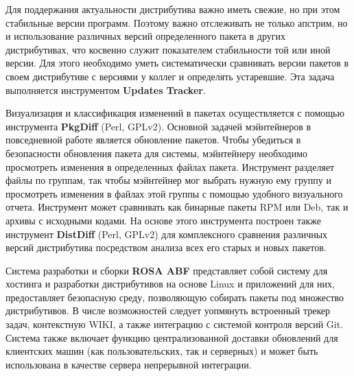 \documentclass[10pt, a5paper]{article}
\begin{document}
Для поддержания актуальности дистрибутива важно иметь свежие, но при этом стабильные версии программ. Поэтому важно отслеживать не только апстрим, но и использование различных версий определенного пакета в других дистрибутивах, что косвенно служит показателем стабильности той или иной версии. Для этого необходимо уметь систематически сравнивать версии пакетов в своем дистрибутиве с версиями у коллег и определять устаревшие. Эта задача выполняется инструментом \textbf{Updates Tracker}.

Визуализация и классификация изменений в пакетах осуществляется с помощью инструмента \textbf{PkgDiff} (Perl, GPLv2). Основной задачей мэйнтейнеров в повседневной работе является обновление пакетов. Чтобы убедиться в безопасности обновления пакета для системы, мэйнтейнеру необходимо просмотреть изменения в определенных файлах пакета. Инструмент разделяет файлы по группам, так чтобы мэйнтейнер мог выбрать нужную ему группу и просмотреть изменения в файлах этой группы с помощью удобного визуального отчета. Инструмент может сравнивать как бинарные пакеты RPM или Deb, так и архивы с исходными кодами. На основе этого инструмента построен также инструмент \textbf{DistDiff} (Perl, GPLv2) для комплексного сравнения различных версий дистрибутива посредством анализа всех его старых и новых пакетов.

Система разработки и сборки \textbf{ROSA ABF} представляет собой систему для хостинга и разработки дистрибутивов на основе Linux и приложений для них, предоставляет безопасную среду, позволяющую собирать пакеты под множество дистрибутивов. В числе возможностей следует уопмянуть встроенный трекер задач, контекстную WIKI, а также интеграцию с системой контроля версий Git. Система также включает функцию централизованной доставки обновлений для клиентских машин (как пользовательских, так и серверных) и может быть использована в качестве сервера непрерывной интеграции.
\end{document}
